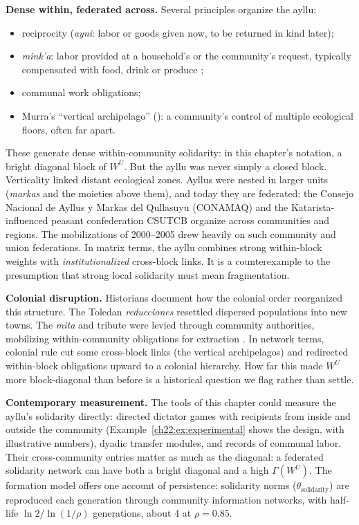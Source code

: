 \documentclass[../structural_economics_book.tex]{subfiles}
\begin{document}
\textbf{Dense within, federated across.} Several principles organize the ayllu:
\begin{itemize}
\item reciprocity (\textit{ayni}: labor or goods given now, to be returned in kind later);
\item \textit{mink'a}: labor provided at a household's or the community's request, typically compensated with food, drink or produce \citep{alberti1974reciprocidad};
\item communal work obligations;
\item Murra's ``vertical archipelago'' (\citeyear{murra1972control}): a community's control of multiple ecological floors, often far apart.
\end{itemize}
These generate dense within-community solidarity: in this chapter's notation, a bright diagonal block of $W^U$. But the ayllu was never simply a closed block. Verticality linked distant ecological zones. Ayllus were nested in larger units (\textit{markas} and the moieties above them), and today they are federated: the Consejo Nacional de Ayllus y Markas del Qullasuyu (CONAMAQ) and the Katarista-influenced peasant confederation CSUTCB organize across communities and regions. The mobilizations of 2000--2005 drew heavily on such community and union federations. %
In matrix terms, the ayllu combines strong within-block weights with \emph{institutionalized} cross-block links. It is a counterexample to the presumption that strong local solidarity must mean fragmentation.

\textbf{Colonial disruption.} Historians document how the colonial order reorganized this structure. The Toledan \textit{reducciones} resettled dispersed populations into new towns. The \textit{mita} and tribute were levied through community authorities, mobilizing within-community obligations for extraction \citep{stern1982peru,platt1982estado}. In network terms, colonial rule cut some cross-block links (the vertical archipelagos) and redirected within-block obligations upward to a colonial hierarchy. How far this made $W^U$ more block-diagonal than before is a historical question we flag rather than settle.

\textbf{Contemporary measurement.} The tools of this chapter could measure the ayllu's solidarity directly: directed dictator games with recipients from inside and outside the community (Example~\ref{ch22:ex:experimental} shows the design, with illustrative numbers), dyadic transfer modules, and records of communal labor. Their cross-community entries matter as much as the diagonal: a federated solidarity network can have both a bright diagonal and a high $\Gamma(W^U)$. The formation model offers one account of persistence: solidarity norms ($\theta_{\text{solidarity}}$) are reproduced each generation through community information networks, with half-life $\ln 2 / \ln(1/\rho)$ generations, about 4 at $\rho = 0.85$.
\end{document}
